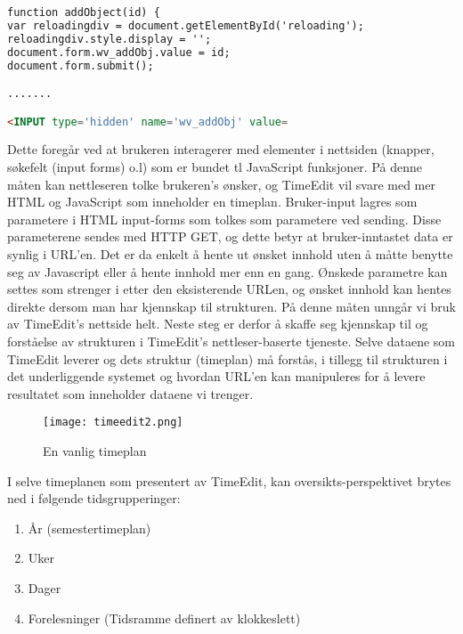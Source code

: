 \documentclass[../main.tex]{subfiles}
\begin{document}
\begin{lstlisting}[language=HTML, frame=single, caption={Utdraget av HTML kildekoden til TimeEdit ovenfor viser en JavaScript-funksjon og en input-tag.}]
function addObject(id) {
var reloadingdiv = document.getElementById('reloading');
reloadingdiv.style.display = '';
document.form.wv_addObj.value = id;
document.form.submit();

.......

<INPUT type='hidden' name='wv_addObj' value=
\end{lstlisting}

Dette foregår ved at brukeren interagerer med elementer i nettsiden (knapper, søkefelt (input forms) o.l) som er bundet tl JavaScript funksjoner. På denne måten kan nettleseren tolke brukeren's ønsker, og TimeEdit vil svare med mer HTML og JavaScript som inneholder en timeplan. Bruker-input lagres som parametere i HTML input-forms som tolkes som parametere ved sending. Disse parameterene sendes med HTTP GET, og dette betyr at bruker-inntastet data er synlig i URL'en. Det er da enkelt å hente ut ønsket innhold uten å måtte benytte seg av Javascript eller å hente innhold mer enn en gang. Ønskede parametre kan settes som strenger i etter den eksisterende URLen, og ønsket innhold kan hentes direkte dersom man har kjennskap til strukturen. På denne måten unngår vi bruk av TimeEdit's nettside helt. \newline
Neste steg er derfor å skaffe seg kjennskap til og forståelse av strukturen i TimeEdit's nettleser-baserte tjeneste. Selve dataene som TimeEdit leverer og dets struktur (timeplan) må forstås, i tillegg til strukturen i det underliggende systemet og hvordan URL'en kan manipuleres for å levere resultatet som inneholder dataene vi trenger.

\begin{figure}[H]
  \centering
  \texttt{[image: timeedit2.png]}
  \caption{En vanlig timeplan}
\label{fig:timeeditc}
\end{figure}

I selve timeplanen som presentert av TimeEdit, kan oversikts-perspektivet brytes ned i følgende tidsgrupperinger:

\begin{enumerate}
\item År (semestertimeplan)
\item Uker
\item Dager
\item Forelesninger (Tidsramme definert av klokkeslett)
\end{enumerate}
\end{document}
